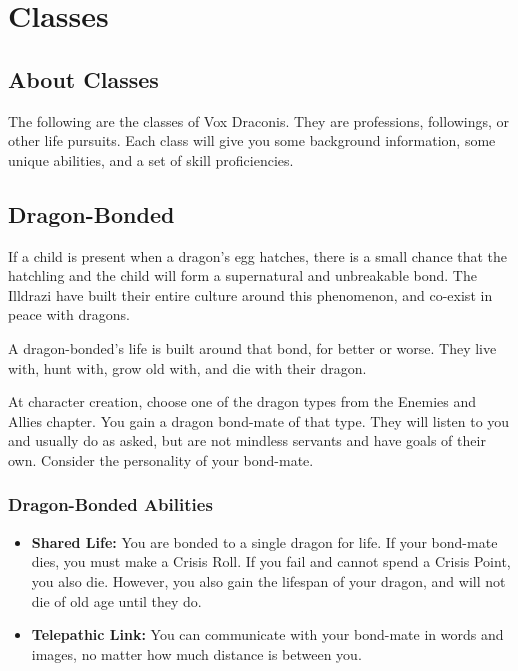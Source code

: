 \chapter{Classes}

\begin{multicols}{2}

\section{About Classes}

The following are the classes of Vox Draconis. They are professions, 
followings, or other life pursuits. Each class will give you some 
background information, some unique abilities, and a set of skill 
proficiencies.

\section{Dragon-Bonded}

If a child is present when a dragon's egg hatches, there is a small 
chance that the hatchling and the child will form a supernatural and 
unbreakable bond. The Illdrazi have built their entire culture around 
this phenomenon, and co-exist in peace with dragons.

A dragon-bonded's life is built around that bond, for better or worse. 
They live with, hunt with, grow old with, and die with their dragon.

At character creation, choose one of the dragon types from the 
Enemies and Allies chapter. You gain a dragon bond-mate of that 
type. They will listen to you and usually do as asked, but are 
not mindless servants and have goals of their own. Consider the 
personality of your bond-mate.

\subsection{Dragon-Bonded Abilities}

\begin{itemize}
    \item \textbf{Shared Life:} You are bonded to a single dragon for 
    life. If your bond-mate dies, you must make a Crisis Roll. If you 
    fail and cannot spend a Crisis Point, you also die. However, you 
    also gain the lifespan of your dragon, and will not die of old age until 
    they do.
    \item \textbf{Telepathic Link:} You can communicate with your bond-mate in 
    words and images, no matter how much distance is between you.
\end{itemize}


\end{multicols}
